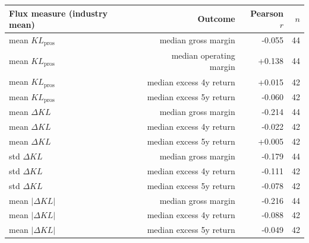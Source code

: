 \begin{tabular}{lrrr}
\toprule
Flux measure (industry mean) & Outcome & Pearson $r$ & $n$ \\
\midrule
mean $KL_{\text{pros}}$ & median gross margin & -0.055 & 44 \\
mean $KL_{\text{pros}}$ & median operating margin & +0.138 & 44 \\
mean $KL_{\text{pros}}$ & median excess 4y return & +0.015 & 42 \\
mean $KL_{\text{pros}}$ & median excess 5y return & -0.060 & 42 \\
mean $\Delta KL$ & median gross margin & -0.214 & 44 \\
mean $\Delta KL$ & median excess 4y return & -0.022 & 42 \\
mean $\Delta KL$ & median excess 5y return & +0.005 & 42 \\
std $\Delta KL$ & median gross margin & -0.179 & 44 \\
std $\Delta KL$ & median excess 4y return & -0.111 & 42 \\
std $\Delta KL$ & median excess 5y return & -0.078 & 42 \\
mean $|\Delta KL|$ & median gross margin & -0.216 & 44 \\
mean $|\Delta KL|$ & median excess 4y return & -0.088 & 42 \\
mean $|\Delta KL|$ & median excess 5y return & -0.049 & 42 \\
\bottomrule
\end{tabular}